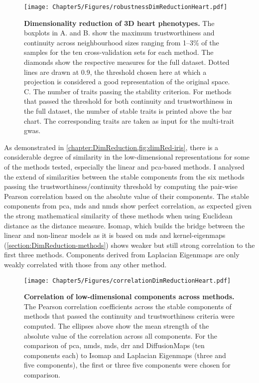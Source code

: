 \begin{figure}[h!]
	\centering
	\texttt{[image: Chapter5/Figures/robustnessDimReductionHeart.pdf]}
	\caption[\textbf{Dimensionality reduction of 3D heart phenotypes. }]{\textbf{Dimensionality reduction of 3D heart phenotypes. } The boxplots in A. and B. show the maximum trustworthiness and continuity across neighbourhood sizes ranging from \numrange{1}{3}\% of the samples for the ten cross-validation sets for each method. The diamonds show the respective measures for the full dataset. Dotted lines are drawn at \num{0.9}, the threshold chosen here at which a projection is considered a good representation of the original space. C. The number of traits passing the stability criterion. For methods that passed the threshold for both continuity and trustworthiness in the full dataset, the number of stable traits is printed above the bar chart. The corresponding traits are taken as input for the multi-trait \gls{gwas}.}
	 	\label{fig:dimRed-heart}
\end{figure}
%
As demonstrated in \cref{chapter:DimReduction,fig:dimRed-iris}, there is a considerable degree of similarity in the low-dimensional representations for some of the methods tested, especially the linear and \gls{pca}-based methods. I analysed the extend of similarities between the stable components from the six methods passing the trustworthiness/continuity threshold by computing the pair-wise Pearson correlation based on the absolute value of their components.  The stable components from \gls{pca}, \gls{mds} and \gls{nmds} show perfect correlation, as expected given the strong mathematical similarity of these methods when using Euclidean distance as the distance measure. Isomap, which builds the bridge between the linear and non-linear models as it is based on \gls{mds} and kernel-eigenmaps (\cref{section:DimReduction-methods}) shows weaker but still strong correlation to the first three methods. Components derived from Laplacian Eigenmaps are only weakly correlated with those from any other method. 
%
\begin{figure}[t]
	\centering
	\texttt{[image: Chapter5/Figures/correlationDimReductionHeart.pdf]}
	\caption[\textbf{Correlation of low-dimensional components across methods. }]{\textbf{Correlation of low-dimensional components across methods. } The Pearson correlation coefficients across the stable components of methods that passed the continuity and trustworthiness criteria were computed. The ellipses above show the mean strength of the absolute value of the correlation across all components. For the comparison of \gls{pca}, \gls{nmds}, \gls{mds}, \gls{drr} and DiffusionMaps (ten components each) to Isomap and Laplacian Eigenmaps (three and five components), the first or three five components were chosen for comparison.}
	 	\label{fig:dimRed-correlation}
\end{figure}

